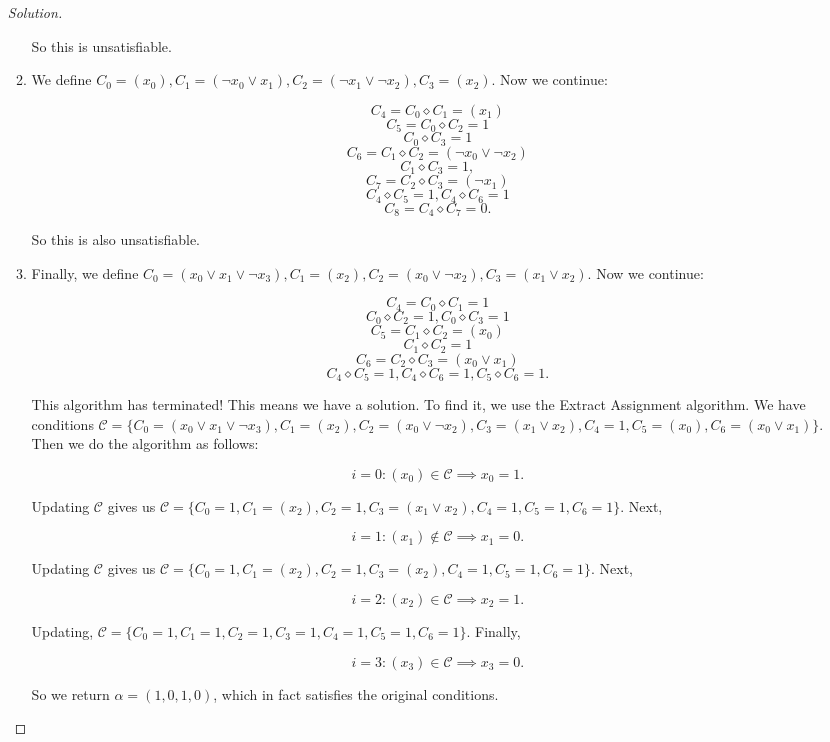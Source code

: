 \documentclass[11pt]{article}
\begin{document}
\begin{enumerate}
\begin{proof}[Solution]
\begin{enumerate}
So this is unsatisfiable.

\item We define $C_0 = (x_0), C_1 = (\neg x_0 \vee x_1), C_2 = (\neg x_1 \vee \neg x_2), C_3 = (x_2)$. Now we continue:

$$
C_4 = C_0 \diamond C_1 = (x_1)
$$ $$
C_5 = C_0 \diamond C_2 = 1
$$  $$
C_0 \diamond C_3 = 1
$$ $$
C_6 = C_1 \diamond C_2 = (\neg x_0 \vee \neg x_2 )
$$ $$
C_1 \diamond C_3 = 1,
$$ $$
C_7 = C_2 \diamond C_3 = (\neg x_1)
$$ $$
C_4 \diamond C_5 = 1, C_4 \diamond C_6 = 1
$$ $$
C_8 = C_4 \diamond C_7 = 0.
$$

So this is also unsatisfiable.

\item Finally, we define $C_0 = (x_0 \vee x_1 \vee \neg x_3), C_1 = (x_2), C_2 = (x_0 \vee \neg x_2), C_3 = (x_1 \vee x_2)$. Now we continue:

$$
C_4 = C_0 \diamond C_1 = 1
$$ $$
C_0 \diamond C_2 = 1, C_0 \diamond C_3 = 1
$$  $$
C_5 = C_1 \diamond C_2= (x_0)
$$ $$
C_1 \diamond C_2 = 1
$$ $$
C_6 = C_2 \diamond C_3 = (x_0 \vee x_1 )
$$ $$
C_4 \diamond C_5 = 1, C_4 \diamond C_6 = 1, C_5 \diamond C_6 = 1.
$$

This algorithm has terminated! This means we have a solution. To find it, we use the Extract Assignment algorithm. We have conditions $\mathcal{C} = \{ C_0 = (x_0 \vee x_1 \vee \neg x_3), C_1 = (x_2), C_2 = (x_0 \vee \neg x_2), C_3 = (x_1 \vee x_2), C_4 = 1, C_5 = (x_0), C_6 = (x_0 \vee x_1) \}$. Then we do the algorithm as follows:

$$
i = 0: (x_0) \in \mathcal{C} \implies x_0 = 1.
$$

Updating $\mathcal{C}$ gives us $\mathcal{C} = \{ C_0 = 1, C_1 = (x_2), C_2 = 1, C_3 = (x_1 \vee x_2), C_4 = 1, C_5 = 1, C_6 = 1 \}$. Next,

$$
i = 1: (x_1) \notin \mathcal{C} \implies x_1 = 0.
$$

Updating $\mathcal{C}$ gives us $\mathcal{C} = \{ C_0 = 1, C_1 = (x_2), C_2 = 1, C_3 = (x_2), C_4 = 1, C_5 = 1, C_6 = 1 \}$. Next,

$$
i = 2: (x_2) \in \mathcal{C} \implies x_2 = 1.
$$

Updating, $\mathcal{C} = \{ C_0 = 1, C_1 = 1, C_2 = 1, C_3 = 1, C_4 = 1, C_5 = 1, C_6 = 1 \}$. Finally,

$$
i = 3: (x_3) \in \mathcal{C} \implies x_3 = 0.
$$

So we return $\alpha = (1, 0, 1, 0)$, which in fact satisfies the original conditions.

\end{enumerate}
  

\end{proof}
\end{enumerate}
\end{document}
